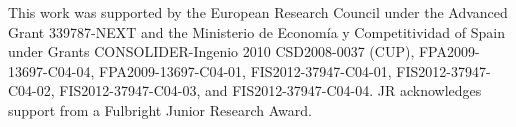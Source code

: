 \documentclass[a4paper,11pt]{article}
\begin{document}
\acknowledgments

This work was supported by the European Research Council under the Advanced Grant 339787-NEXT and the Ministerio de Econom\'{i}a y Competitividad of Spain under Grants CONSOLIDER-Ingenio 2010 CSD2008-0037 (CUP), FPA2009-13697-C04-04, FPA2009-13697-C04-01, FIS2012-37947-C04-01, FIS2012-37947-C04-02, FIS2012-37947-C04-03, and FIS2012-37947-C04-04.  JR acknowledges support from a Fulbright Junior Research Award.


\end{document}
